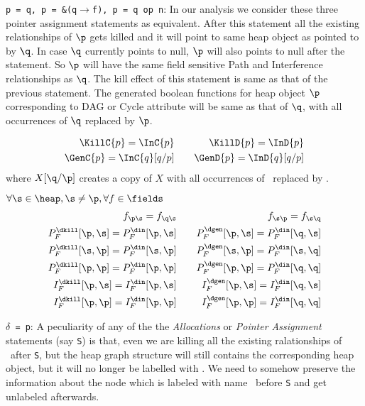 \begin{enumerate}
\item{\tt p = q, p = \&(q$\rightarrow$f), p = q op n}: 
In our analysis  
we consider these three pointer assignment statements as
  equivalent. 
After this statement all the existing relationships of $\p$ gets
killed and it will point to same heap object as pointed to
by $\q$. In case $\q$ currently points to null, $\p$ will also points
to null after the statement. So $\p$ will have the same field
sensitive Path and Interference relationships as $\q$. 
The kill effect of this statement is same as that of the previous statement. 
The generated boolean functions for heap object $\p$ corresponding 
to DAG or Cycle attribute will be same as that of $\q$, with all occurrences of $\q$ 
replaced by $\p$.

\begin{eqnarray*}
  \KillC{p} = \InC{p} &\quad& \KillD{p} = \InD{p} \\ 
  \GenC{p}   = \InC{q}[q/p]
  &\quad& \GenD{p} = \InD{q}[q/p] 
\end{eqnarray*}
{where $X[\q/\p]$ creates a copy of $X$ with all occurrences
  of \q\ replaced by \p.}

$\forall \s \in \heap, \s \not= \p, \forall f \in \fields$
\begin{eqnarray*}
  f_{\p\s} = f_{\q\s}  &\quad&  f_{\s\p} = f_{\s\q} \\
  P_F^{\dkill}[\p,\s]  =  P_F^{\din}[\p,\s] &\quad&
  P_F^{\dgen}[\p,\s]    =  P_F^{\din}[\q,\s]   \\ 
  P_F^{\dkill}[\s,\p]  =  P_F^{\din}[\s,\p] &\quad&
  P_F^{\dgen}[\s,\p]    =  P_F^{\din}[\s,\q]   \\
  P_F^{\dkill}[\p,\p]  =  P_F^{\din}[\p,\p] &\quad&
  P_F^{\dgen}[\p,\p]    =  P_F^{\din}[\q,\q]  \rule{0mm}{0pt}\\
  I_F^{\dkill}[\p,\s]  =  I_F^{\din}[\p,\s] &\quad&
  I_F^{\dgen}[\p,\s]    =   I_F^{\din}[\q,\s] \\
  I_F^{\dkill}[\p,\p]  =  I_F^{\din}[\p,\p] &\quad&
  I_F^{\dgen}[\p,\p]    = I_F^{\din}[\q,\q] 
\end{eqnarray*}

{\blue
\item{\tt $\delta$ = p}:
A peculiarity of any of the the \textit{Allocations} or \textit{Pointer Assignment} statements (say {\tt S}) is that,  
even we are killing all the existing ralationships of \p\ after {\tt S}, but the heap graph structure will still contains 
the corresponding heap object, but it will no longer be labelled with \p. We need to somehow preserve the information about the node 
which is labeled with name \p\ before  {\tt S} and get unlabeled afterwards.

}
\end{enumerate}
